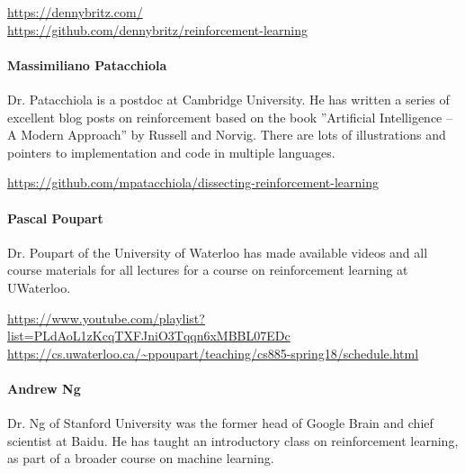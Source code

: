 \begin{tcolorbox}[colback=code]
\footnotesize
\url{https://dennybritz.com/} \\

\url{https://github.com/dennybritz/reinforcement-learning}
\end{tcolorbox}


\paragraph*{Massimiliano Patacchiola} 

Dr. Patacchiola is a postdoc at Cambridge University. He has written a series of excellent blog posts on reinforcement based on the book ''Artificial Intelligence -- A Modern Approach'' by Russell and Norvig. There are lots of illustrations and pointers to implementation and code in multiple languages. \\

\begin{tcolorbox}[colback=code]
\footnotesize
\url{https://github.com/mpatacchiola/dissecting-reinforcement-learning}
\end{tcolorbox}

\paragraph*{Pascal Poupart}

Dr. Poupart of the University of Waterloo has made available videos and all course materials for all lectures for a course on reinforcement learning at UWaterloo. \\

\begin{tcolorbox}[colback=code]
\footnotesize
\url{https://www.youtube.com/playlist?list=PLdAoL1zKcqTXFJniO3Tqqn6xMBBL07EDc} \\

\url{https://cs.uwaterloo.ca/~ppoupart/teaching/cs885-spring18/schedule.html}
\end{tcolorbox}


\paragraph*{Andrew Ng}

Dr. Ng of Stanford University was the former head of Google Brain and chief scientist at Baidu. He has taught an introductory class on reinforcement learning, as part of a broader course on machine learning. \\

